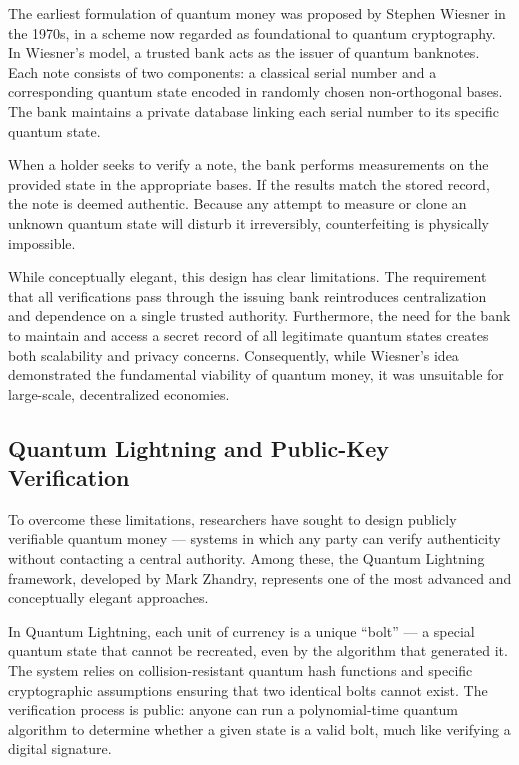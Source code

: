The earliest formulation of quantum money was proposed by Stephen Wiesner in the 1970s, in a scheme now regarded as foundational to quantum cryptography. In Wiesner’s model, a trusted bank acts as the issuer of quantum banknotes. Each note consists of two components: a classical serial number and a corresponding quantum state encoded in randomly chosen non-orthogonal bases. The bank maintains a private database linking each serial number to its specific quantum state.

When a holder seeks to verify a note, the bank performs measurements on the provided state in the appropriate bases. If the results match the stored record, the note is deemed authentic. Because any attempt to measure or clone an unknown quantum state will disturb it irreversibly, counterfeiting is physically impossible.

While conceptually elegant, this design has clear limitations. The requirement that all verifications pass through the issuing bank reintroduces centralization and dependence on a single trusted authority. Furthermore, the need for the bank to maintain and access a secret record of all legitimate quantum states creates both scalability and privacy concerns. Consequently, while Wiesner’s idea demonstrated the fundamental viability of quantum money, it was unsuitable for large-scale, decentralized economies.
\subsection{Quantum Lightning and Public-Key Verification}\label{s:2.1}
To overcome these limitations, researchers have sought to design publicly verifiable quantum money — systems in which any party can verify authenticity without contacting a central authority. Among these, the Quantum Lightning framework, developed by Mark Zhandry, represents one of the most advanced and conceptually elegant approaches.

In Quantum Lightning, each unit of currency is a unique “bolt” — a special quantum state that cannot be recreated, even by the algorithm that generated it. The system relies on collision-resistant quantum hash functions and specific cryptographic assumptions ensuring that two identical bolts cannot exist. The verification process is public: anyone can run a polynomial-time quantum algorithm to determine whether a given state is a valid bolt, much like verifying a digital signature.


